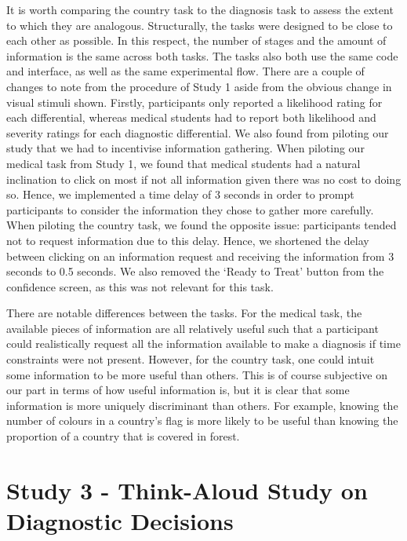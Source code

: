 \documentclass[a4paper, nobind]{templates/ociamthesis}
\begin{document}
It is worth comparing the country task to the diagnosis task to assess the extent to which they are analogous. Structurally, the tasks were designed to be close to each other as possible. In this respect, the number of stages and the amount of information is the same across both tasks. The tasks also both use the same code and interface, as well as the same experimental flow. There are a couple of changes to note from the procedure of Study 1 aside from the obvious change in visual stimuli shown. Firstly, participants only reported a likelihood rating for each differential, whereas medical students had to report both likelihood and severity ratings for each diagnostic differential. We also found from piloting our study that we had to incentivise information gathering. When piloting our medical task from Study 1, we found that medical students had a natural inclination to click on most if not all information given there was no cost to doing so. Hence, we implemented a time delay of 3 seconds in order to prompt participants to consider the information they chose to gather more carefully. When piloting the country task, we found the opposite issue: participants tended not to request information due to this delay. Hence, we shortened the delay between clicking on an information request and receiving the information from 3 seconds to 0.5 seconds. We also removed the `Ready to Treat' button from the confidence screen, as this was not relevant for this task.

There are notable differences between the tasks. For the medical task, the available pieces of information are all relatively useful such that a participant could realistically request all the information available to make a diagnosis if time constraints were not present. However, for the country task, one could intuit some information to be more useful than others. This is of course subjective on our part in terms of how useful information is, but it is clear that some information is more uniquely discriminant than others. For example, knowing the number of colours in a country's flag is more likely to be useful than knowing the proportion of a country that is covered in forest.

\hypertarget{study-3---think-aloud-study-on-diagnostic-decisions}{%
\chapter*{Study 3 - Think-Aloud Study on Diagnostic Decisions}\label{study-3---think-aloud-study-on-diagnostic-decisions}}
\end{document}
